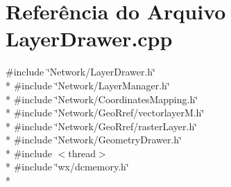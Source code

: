 \section{Referência do Arquivo Layer\+Drawer.\+cpp}
\label{_layer_drawer_8cpp}
{\ttfamily \#include \char`\"{}Network/\+Layer\+Drawer.\+h\char`\"{}}\\*
{\ttfamily \#include \char`\"{}Network/\+Layer\+Manager.\+h\char`\"{}}\\*
{\ttfamily \#include \char`\"{}Network/\+Coordinates\+Mapping.\+h\char`\"{}}\\*
{\ttfamily \#include \char`\"{}Network/\+Geo\+Rref/vectorlayer\+M.\+h\char`\"{}}\\*
{\ttfamily \#include \char`\"{}Network/\+Geo\+Rref/raster\+Layer.\+h\char`\"{}}\\*
{\ttfamily \#include \char`\"{}Network/\+Geometry\+Drawer.\+h\char`\"{}}\\*
{\ttfamily \#include $<$thread$>$}\\*
{\ttfamily \#include \char`\"{}wx/dcmemory.\+h\char`\"{}}\\*

